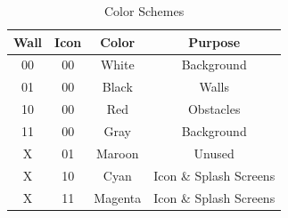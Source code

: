 \documentclass[11pt]{article}
\begin{document}
	\begin {table}
	\begin {center} 
	\vspace{15pt}
	
	\begin{tabular}{||c|c|c|c||}\hline	
		\textbf{Wall}	&	\textbf{Icon}	&	\textbf{Color}	&	\textbf{Purpose}		\\\hline
		00		&	00		&	White 	&	Background 	\\\hline
		01		&	00		&	Black 	&	Walls 		\\\hline
		10		&	00		&	Red 	&	Obstacles 	\\\hline
		11		&	00		&	Gray 	&	Background	\\\hline
		X		&	01		&	Maroon	&	Unused		\\\hline
		X		&	10		&	Cyan	&	Icon \& Splash Screens	\\\hline
		X		&	11		&	Magenta	&	Icon \& Splash Screens	\\\hline	
	\end{tabular}
		\caption {Color Schemes} \label{colorizer}
	\end{center}
	\end{table} 		

%


\end{document}
